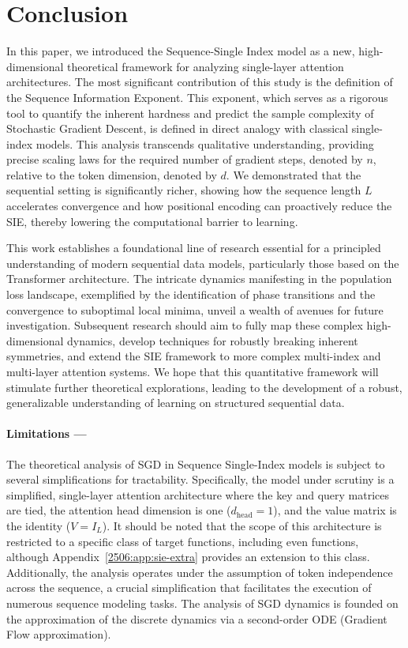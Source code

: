 \section{Conclusion}
In this paper, we introduced the Sequence-Single Index model as a new, high-dimensional theoretical framework for analyzing single-layer attention architectures. The most significant contribution of this study is the definition of the Sequence Information Exponent. This exponent, which serves as a rigorous tool to quantify the inherent hardness and predict the sample complexity of Stochastic Gradient Descent, is defined in direct analogy with classical single-index models. This analysis transcends qualitative understanding, providing precise scaling laws for the required number of gradient steps, denoted by $n$, relative to the token dimension, denoted by $d$. We demonstrated that the sequential setting is significantly richer, showing how the sequence length $L$ accelerates convergence and how positional encoding can proactively reduce the SIE, thereby lowering the computational barrier to learning.

This work establishes a foundational line of research essential for a principled understanding of modern sequential data models, particularly those based on the Transformer architecture. The intricate dynamics manifesting in the population loss landscape, exemplified by the identification of phase transitions and the convergence to suboptimal local minima, unveil a wealth of avenues for future investigation. Subsequent research should aim to fully map these complex high-dimensional dynamics, develop techniques for robustly breaking inherent symmetries, and extend the SIE framework to more complex multi-index and multi-layer attention systems. We hope that this quantitative framework will stimulate further theoretical explorations, leading to the development of a robust, generalizable understanding of learning on structured sequential data.

\paragraph{Limitations ---} The theoretical analysis of SGD in Sequence Single-Index models is subject to several simplifications for tractability. Specifically, the model under scrutiny is a simplified, single-layer attention architecture where the key and query matrices are tied, the attention head dimension is one (\(d_\mathrm{head}=1\)), and the value matrix is the identity (\(V=I_L\)). It should be noted that the scope of this architecture is restricted to a specific class of target functions, including even functions, although Appendix~\ref{2506:app:sie-extra} provides an extension to this class. Additionally, the analysis operates under the assumption of token independence across the sequence, a crucial simplification that facilitates the execution of numerous sequence modeling tasks. The analysis of SGD dynamics is founded on the approximation of the discrete dynamics via a second-order ODE (Gradient Flow approximation).
